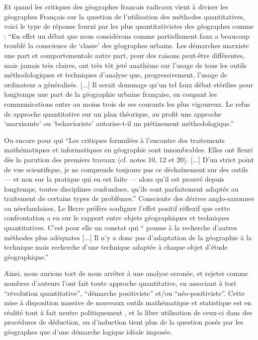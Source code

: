 Et quand les critiques des géographes francais radicaux vient à diviser les géographes Français sur la question de l'utilisation des méthodes quantitatives, voici le type de réponse fourni par les plus quantitativistes des géographes comme \textcite[337-338]{Pumain1983} : \enquote{En effet un débat que nous considérons comme partiellement faux a beaucoup troublé la conscience de \enquote{classe} des géographes urbains. Les démarches marxiste une part et comportementale autre part, pour des raisons peut-être différentes, mais jamais très claires, ont très tôt jeté anathème sur l'usage de tous les outils méthodologiques et techniques d'analyse que, progressivement, l'usage de ordinateur a généralisés. [...] Il serait dommage qu'un tel faux débat stérilise pour longtemps une part de la géographie urbaine française, en coupant les communications entre au moins trois de ses courants les plus vigoureux. Le refus de approche quantitative sur un plan théorique, au profit une approche \enquote{marxisante} ou \enquote{behavioriste} autorise-t-il un piétinement méthodologique.} 

Ou encore \textcite[11]{LeBerre1987} pour qui \enquote{Les critiques formulées à l'encontre des traitements mathématiques et informatiques en géographie sont innombrables. Elles ont fleuri dès la parution des premiers travaux (cf. notes 10, 12 et 20). [...] D'un strict point de vue scientifique, je ne comprends toujours pas ce déchaînement sur des outils — et non sur la pratique qui en est faite — alors qu'il est prouvé depuis longtemps, toutes disciplines confondues, qu'ils sont parfaitement adaptés au traitement de certains types de problèmes.} Consciente des dérives anglo-saxonnes ou néerlandaises, Le Berre préfère souligner l'effet positif réflexif que cette confrontation a eu sur le rapport entre objets géographiques et techniques quantitatives. C'est pour elle un constat qui \enquote{ pousse à la recherche d’autres méthodes plus adéquates [...] Il n’y a donc pas d’adaptation de la géographie à la technique mais recherche d'une technique adaptée à chaque objet d'étude géographique.}

Ainsi, nous aurions tort de nous arrêter à une analyse erronée, et rejeter comme nombres d'auteurs l'ont fait toute approche quantitative, en associant à tort \enquote{révolution quantitative}, \enquote{démarche positiviste} et/ou \enquote{néo-positiviste}. Cette mise à disposition massive de nouveaux outils mathématique et statistique est en réalité tout à fait neutre politiquement \autocite{Sheppard2001}, et la libre utilisation de ceux-ci dans des procédures de déduction, ou d'induction tient plus de la question posés par les géographes que d'une démarche logique idéale imposée. \autocite{Sanders2000}

